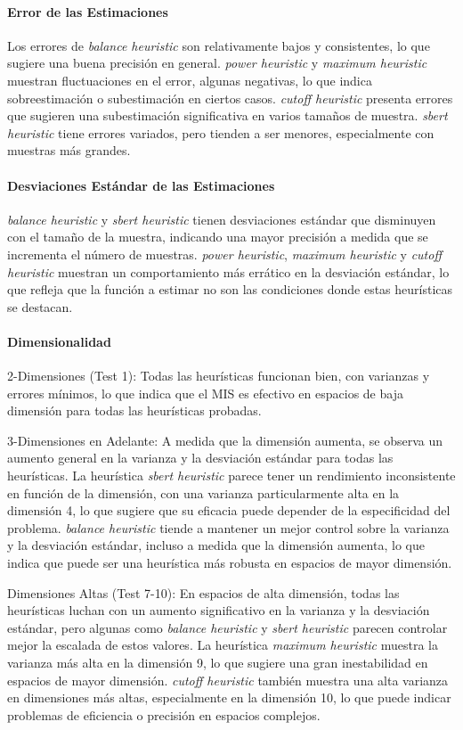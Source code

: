 \documentclass{article}
\begin{document}
\paragraph{Error de las Estimaciones}
Los errores de \textit{balance heuristic} son relativamente bajos y consistentes, lo que sugiere una buena precisión en general.
\textit{power heuristic} y \textit{maximum heuristic} muestran fluctuaciones en el error, algunas negativas, lo que indica sobreestimación o subestimación en ciertos casos.
\textit{cutoff heuristic} presenta errores que sugieren una subestimación significativa en varios tamaños de muestra.
\textit{sbert heuristic} tiene errores variados, pero tienden a ser menores, especialmente con muestras más grandes.

\paragraph{Desviaciones Estándar de las Estimaciones}
\textit{balance heuristic} y \textit{sbert heuristic} tienen desviaciones estándar que disminuyen con el tamaño de la muestra, indicando una mayor precisión a medida que se incrementa el número de muestras.
\textit{power heuristic}, \textit{maximum heuristic} y \textit{cutoff heuristic} muestran un comportamiento más errático en la desviación estándar, lo que refleja que la función a estimar no son las condiciones donde estas heurísticas se destacan.

\paragraph{Dimensionalidad}
2-Dimensiones (Test 1): Todas las heurísticas funcionan bien, con varianzas y errores mínimos, lo que indica que el MIS es efectivo en espacios de baja dimensión para todas las heurísticas probadas.

3-Dimensiones en Adelante: A medida que la dimensión aumenta, se observa un aumento general en la varianza y la desviación estándar para todas las heurísticas. La heurística \textit{sbert heuristic} parece tener un rendimiento inconsistente en función de la dimensión, con una varianza particularmente alta en la dimensión 4, lo que sugiere que su eficacia puede depender de la especificidad del problema.
\textit{balance heuristic} tiende a mantener un mejor control sobre la varianza y la desviación estándar, incluso a medida que la dimensión aumenta, lo que indica que puede ser una heurística más robusta en espacios de mayor dimensión.

Dimensiones Altas (Test 7-10): En espacios de alta dimensión, todas las heurísticas luchan con un aumento significativo en la varianza y la desviación estándar, pero algunas como \textit{balance heuristic} y \textit{sbert heuristic} parecen controlar mejor la escalada de estos valores.
La heurística \textit{maximum heuristic} muestra la varianza más alta en la dimensión 9, lo que sugiere una gran inestabilidad en espacios de mayor dimensión.
\textit{cutoff heuristic} también muestra una alta varianza en dimensiones más altas, especialmente en la dimensión 10, lo que puede indicar problemas de eficiencia o precisión en espacios complejos.
\end{document}

